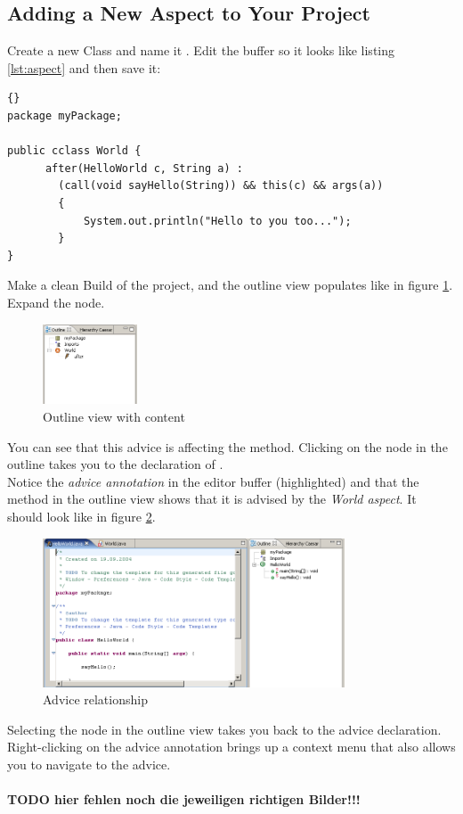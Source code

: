 \subsection{Adding a New Aspect to Your Project}
Create a new Class and name it . Edit the buffer so it looks like listing \ref{lst:aspect} and then save it:
\begin{lstlisting}[basicstyle=\small\it,caption=An \caesarj -cclass including an aspect,label=lst:aspect,name=listing:aspect,frame=none]{}
package myPackage;

public cclass World { 	
      after(HelloWorld c, String a) :
      	(call(void sayHello(String)) && this(c) && args(a))
		{
            System.out.println("Hello to you too...");
		}
}\end{lstlisting}

Make a clean Build of the project, and the outline view populates like in figure \ref{fig:aspect2}. Expand the  node.

\begin{figure}[htbp]
	\centering
		\includegraphics[width=0.25\textwidth]{images/aspect2.png}
	\caption{Outline view with content}
	\label{fig:aspect2}
\end{figure}

You can see that this advice is affecting the  method. Clicking on the  node in the outline takes you to the declaration of .\\
Notice the \textit{advice annotation} in the editor buffer (highlighted) and that the  method in the outline view shows that it is advised by the \textit{World aspect}. It should look like in figure \ref{fig:aspect3}.

\begin{figure}[htbp]
	\centering
		\includegraphics[width=0.80\textwidth]{images/aspect3.png}
	\caption{Advice relationship}
	\label{fig:aspect3}
\end{figure}

Selecting the  node in the outline view takes you back to the advice declaration. Right-clicking on the advice annotation brings up a context menu that also allows you to navigate to the advice.\\\\
\textbf{TODO hier fehlen noch die jeweiligen richtigen Bilder!!!}

